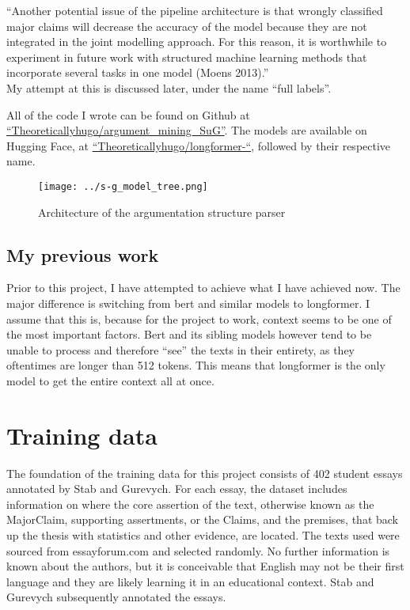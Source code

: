 \documentclass[12]{article}
\theoremstyle{mytheoremstyle}
\theoremstyle{mytheoremstyle}
\theoremstyle{myproblemstyle}
\begin{document}
  ``Another potential issue of the pipeline architecture is that
  wrongly classified major claims will decrease the accuracy of the model because they
  are not integrated in the joint modelling approach. For this reason, it is worthwhile to
  experiment in future work with structured machine learning methods that incorporate
  several tasks in one model (Moens 2013).''\cite{stab-gurevych-2017-parsing}\\
  My attempt at this is discussed later, under the name ``full labels''.

  All of the code I wrote can be found on Github at \href{https://github.com/Theoreticallyhugo/argument_mining_SuG}{``Theoreticallyhugo/argument\_mining\_SuG''}. 
  The models are available on Hugging Face, at \href{https://huggingface.co/Theoreticallyhugo}{``Theoreticallyhugo/longformer-``}, followed by their respective name. 
  \begin{figure}[!h]
    \centering
    \texttt{[image: ../s-g\_model\_tree.png]}
    \caption{Architecture of the argumentation structure parser}
    \label{fig:model_tree}
  \end{figure}
  \subsection{My previous work}
  Prior to this project, I have attempted to achieve what I have achieved now.
  The major difference is switching from bert and similar models to longformer. 
  I assume that this is, because for the project to work, context seems to be one of the most important factors. 
  Bert and its sibling models however tend to be unable to process and therefore ``see'' the texts in their entirety, as they oftentimes are longer than 512 tokens. 
  This means that longformer is the only model to get the entire context all at once.

  \section{Training data\dotfill}
  The foundation of the training data for this project consists of 402 student essays annotated by Stab and Gurevych. 
  For each essay, the dataset includes information on where the core assertion of the text, otherwise known as the MajorClaim, supporting assertments, or the Claims, and the premises, that back up the thesis with statistics and other evidence, are located. 
  The texts used were sourced from essayforum.com and selected randomly. 
  No further information is known about the authors, but it is conceivable that English may not be their first language and they are likely learning it in an educational context.
  Stab and Gurevych subsequently annotated the essays.
  
\end{document}
